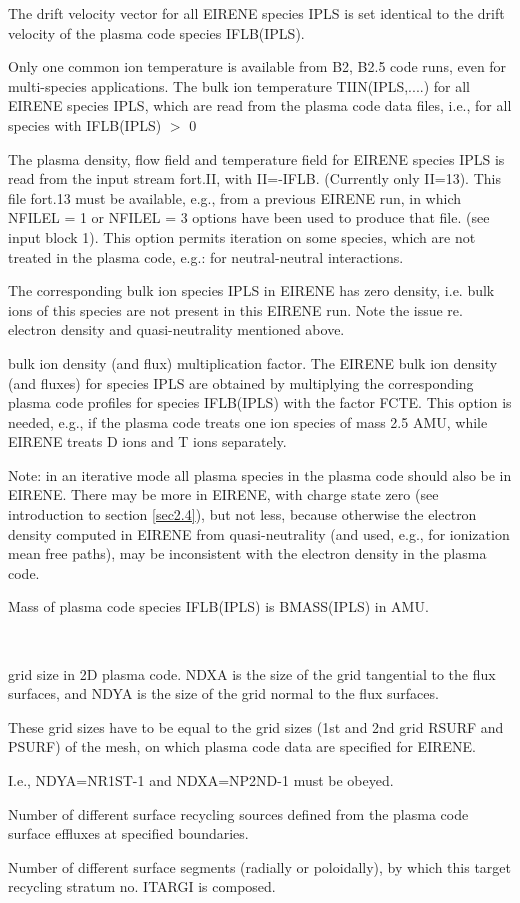 \begin{list}{ }{}
\begin{list}{ }{}
The drift velocity vector for all EIRENE species IPLS is set identical
to the drift velocity of the plasma code species IFLB(IPLS).

Only one common ion temperature is available from B2, B2.5 code
runs, even for multi-species applications. The bulk ion temperature
TIIN(IPLS,....) for all EIRENE species IPLS, which are read from the
plasma code data files, i.e., for all species with IFLB(IPLS) $>$ 0
\item[{$<$ 0 }]
The plasma density, flow field and temperature field for EIRENE species
IPLS is read from the input stream fort.II, with II=-IFLB.
(Currently only II=13). This file fort.13 must be available, e.g., from a
previous EIRENE run, in which NFILEL = 1 or NFILEL = 3 options have been
used to produce that file.
(see input block 1).
This option permits iteration on some species, which are not treated
in the plasma code, e.g.: for neutral-neutral interactions.
\item[{= 0 }]
The corresponding bulk ion species IPLS in EIRENE has zero density,
i.e. bulk ions of this species are not present in this EIRENE run.
Note the issue re. electron density and quasi-neutrality mentioned
above.
\end{list}
\item[{\bf FCTE }]
bulk ion density (and flux) multiplication factor. The EIRENE bulk
ion density (and fluxes) for species IPLS are obtained by multiplying the
corresponding plasma code profiles for species IFLB(IPLS) with the
factor FCTE. This option is needed, e.g., if the plasma code treats
one ion species of mass 2.5 AMU, while EIRENE treats D ions and
T ions separately.

Note: in an iterative mode all plasma species in the plasma code
should also be in EIRENE. There may be more in EIRENE, with charge
state zero (see introduction to section \ref{sec2.4}), but not
less, because otherwise the electron density computed in EIRENE
from quasi-neutrality (and used, e.g., for ionization mean free
paths), may be inconsistent with the electron density in the
plasma code.
\item[{\bf BMASS }]
Mass of plasma code species IFLB(IPLS) is BMASS(IPLS) in AMU.
\item[{\bf NDXA,NDYA }] ~

grid size in 2D plasma code. NDXA is the size of the
grid tangential to the
flux surfaces, and NDYA is the size of the grid
normal to the flux surfaces.

These grid sizes have to be equal to the
grid sizes (1st and 2nd grid RSURF and PSURF) of the mesh, on which
plasma code data are specified for EIRENE.

I.e., NDYA=NR1ST-1 and NDXA=NP2ND-1 must be obeyed.
\item[{\bf NTARGI }]
Number of different surface recycling sources defined
from the plasma
code surface effluxes at specified boundaries.
\item[{\bf NTGPRT }]
Number of different surface segments (radially or poloidally), by which
this target recycling stratum no. ITARGI is composed.
\end{list}

